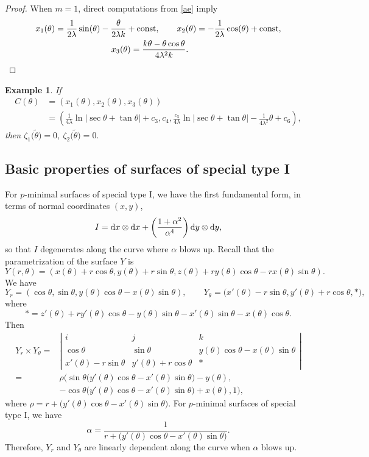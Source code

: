 \documentclass[pdftex]{sigma}
\numberwithin{equation}{section}
\newtheorem{Example}[Theorem]{Example}
\begin{document}
\begin{proof}
When $m =1$, direct computations from \eqref{ae} imply
\begin{gather*}
x_1(\theta)=\frac{1}{2\lambda}\sin(\theta)-\frac{\theta}{2\lambda k}+\text{\rm const},\qquad
x_2(\theta)=-\frac{1}{2\lambda}\cos(\theta)+\text{\rm const},\\
x_3(\theta)=\frac{k\theta-\theta\cos\theta}{4\lambda^2k}.\tag*{\qed}
\end{gather*} \renewcommand{\qed}{}
\end{proof}

\begin{Example}
If
\begin{align*}
C(\theta )& =(x_{1}(\theta ),x_{2}(\theta ),x_{3}(\theta )) \\
& =\left(\frac{1}{4\lambda }\ln {|\sec {\theta }+\tan {\theta }|}+c_{3},c_{4},
\frac{c_{5}}{4\lambda }\ln {|\sec {\theta }+\tan {\theta }|}-\frac{1}{
4\lambda ^{2}}\theta +c_{6}\right),
\end{align*}
then $\zeta _{1}\bigl(\tilde{\theta}\bigr)=0$, $\zeta _{2}\bigl(\tilde{\theta}\bigr)=0.$
\end{Example}

\subsection{Basic properties of surfaces of special type I}\label{section5.2}
For $p$-minimal surfaces of special type I, we have the first fundamental form, in terms of normal coordinates $(x,y)$,
\[I={\rm d}x\otimes {\rm d}x+\left(\frac{1+\alpha^{2}}{\alpha^4}\right){\rm d}y\otimes {\rm d}y,\]
so that $I$ degenerates along the curve where $\alpha$ blows up. Recall that the parametrization of the surface $Y$ is
\[Y(r,\theta)=(x(\theta)+r\cos{\theta},y(\theta)+r\sin{\theta},z(\theta)+ry(\theta)\cos{\theta}-rx(\theta)\sin{\theta}).\]
We have
\[
Y_{r}=(\cos{\theta},\sin{\theta},y(\theta)\cos{\theta}-x(\theta)\sin{\theta}),\qquad
Y_{\theta}=\bigl(x'(\theta)-r\sin{\theta},y'(\theta)+r\cos{\theta},*\bigr),
\]
where
\[*=z'(\theta)+ry'(\theta)\cos{\theta}-y(\theta)\sin{\theta}-x'(\theta)\sin{\theta}-x(\theta)\cos{\theta}.\]
Then
\begin{align*}
Y_{r}\times Y_{\theta}={}&\left|\begin{matrix}
i&j&k\\
\cos{\theta}&\sin{\theta}&y(\theta)\cos{\theta}-x(\theta)\sin{\theta}\\
x'(\theta)-r\sin{\theta}&y'(\theta)+r\cos{\theta}&*
\end{matrix}\right|\\
={}&\rho\bigl(\sin{\theta}\bigl(y'(\theta)\cos{\theta}-x'(\theta)\sin{\theta}\bigr)-y(\theta),\\
&-\cos{\theta}\bigl(y'(\theta)\cos{\theta}-x'(\theta)\sin{\theta}\bigr)+x(\theta),1\bigr),
\end{align*}
where
$\rho=r+\bigl(y'(\theta)\cos{\theta}-x'(\theta)\sin{\theta}\bigr)$.
For $p$-minimal surfaces of special type I, we have
 \[
 \alpha=\frac{1}{r+\bigl(y'(\theta)\cos{\theta}-x'(\theta)\sin{\theta}\bigr)}.
 \]
Therefore, $Y_{r}$ and $Y_{\theta}$ are linearly dependent along the curve when $\alpha$ blows up.
\end{document}
